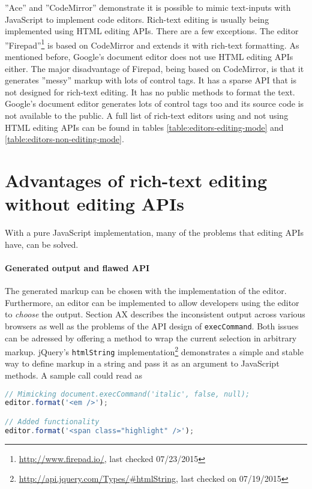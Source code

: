 ''Ace'' and ''CodeMirror'' demonstrate it is possible to mimic text-inputs with JavaScript to implement code editors. Rich-text editing is usually being implemented using HTML editing APIs. There are a few exceptions. The editor ''Firepad''\footnote{\url{http://www.firepad.io/}, last checked 07/23/2015} is based on CodeMirror and extends it with rich-text formatting. As mentioned before, Google's document editor does not use HTML editing APIs either. The major disadvantage of Firepad, being based on CodeMirror, is that it generates ''messy'' markup with lots of control tags. It has a sparse API that is not designed for rich-text editing. It has no public methods to format the text. Google's document editor generates lots of control tags too and its source code is not available to the public. A full list of rich-text editors using and not using HTML editing APIs can be found in tables \ref{table:editors-editing-mode} and \ref{table:editors-non-editing-mode}.

\section{Advantages of rich-text editing without editing APIs}

With a pure JavaScript implementation, many of the problems that editing APIs have, can be solved.

\paragraph{Generated output and flawed API} The generated markup can be chosen with the implementation of the editor. Furthermore, an editor can be implemented to allow developers using the editor to \textit{choose} the output. Section AX describes the inconsistent output across various browsers as well as the problems of the API design of \texttt{execCommand}. Both issues can be adressed by offering a method to wrap the current selection in arbitrary markup. jQuery's \texttt{htmlString} implementation\footnote{\url{http://api.jquery.com/Types/\#htmlString}, last checked on 07/19/2015} demonstrates a simple and stable way to define markup in a string and pass it as an argument to JavaScript methods. A sample call could read as

\begin{lstlisting}[language=JavaScript, caption=Example calls to format text, label=lst:format-examples]
// Mimicking document.execCommand('italic', false, null);
editor.format('<em />');

// Added functionality
editor.format('<span class="highlight" />');
\end{lstlisting}

